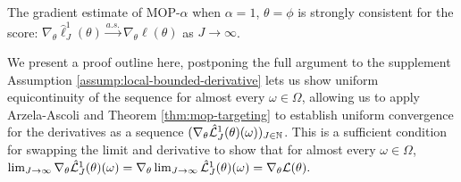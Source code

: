 \documentclass[numsec,webpdf,modern,medium,namedate]{oup-authoring-template}
\newcommand\arxiv[2]{#2} %
\theoremstyle{thmstyleone}%
\theoremstyle{thmstyletwo}%
\theoremstyle{thmstylethree}%
\begin{document}
\begin{thm}
    The gradient estimate of MOP-$\alpha$ when $\alpha=1$, $\theta=\phi$ is strongly consistent for the score: $\nabla_\theta \hat\ell_J^1(\theta) \stackrel{a.s.}{\to} \nabla_\theta \ell(\theta)$ as $J \to \infty$.
    \label{thm:mop-grad-consistency}
\end{thm}


We present a proof outline here, postponing the full argument to \arxiv{Appendix~\ref{appendix:consistency}}{the supplement}
Assumption \ref{assump:local-bounded-derivative} lets us show uniform equicontinuity of the sequence for almost every $\omega \in \Omega$, allowing us to apply Arzela-Ascoli and Theorem \ref{thm:mop-targeting} to establish uniform convergence for the derivatives as a sequence $(\nabla_\theta \hat{\mathcal{L}}_J^1(\theta)(\omega))_{J \in \mathbb{N}}$. This is a sufficient condition for swapping the limit and derivative to show that for almost every $\omega \in \Omega$, $\lim_{J \to \infty} \nabla_\theta \hat{\mathcal{L}}_J^1(\theta)(\omega) = \nabla_\theta \lim_{J \to \infty} \hat{\mathcal{L}}_J^1(\theta)(\omega) = \nabla_\theta \mathcal{L}(\theta).$


    
\end{document}
